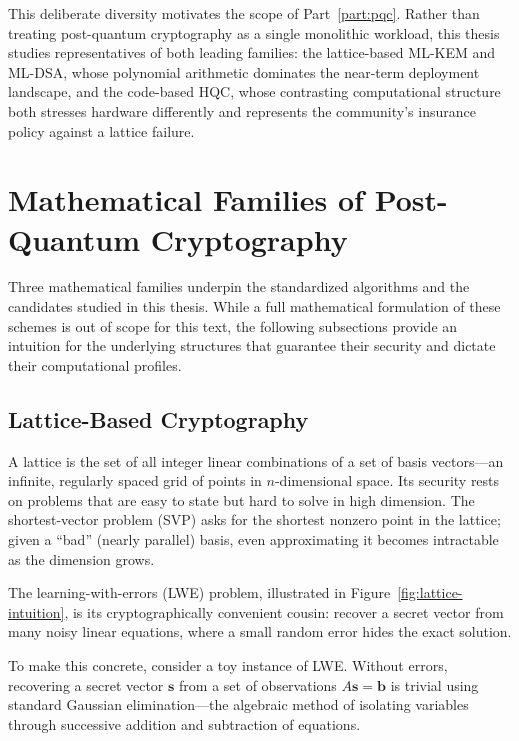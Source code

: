 This deliberate diversity motivates the scope of Part~\ref{part:pqc}. Rather than treating post-quantum cryptography as a single monolithic workload, this thesis studies representatives of both leading families: the lattice-based ML-KEM and ML-DSA, whose polynomial arithmetic dominates the near-term deployment landscape, and the code-based HQC, whose contrasting computational structure both stresses hardware differently and represents the community's insurance policy against a lattice failure.

\section{Mathematical Families of Post-Quantum Cryptography}
\label{sec:pqc-families}

Three mathematical families underpin the standardized algorithms and the candidates studied in this thesis. While a full mathematical formulation of these schemes is out of scope for this text, the following subsections provide an intuition for the underlying structures that guarantee their security and dictate their computational profiles.

\subsection{Lattice-Based Cryptography}
\label{subsec:lattice-crypto}

A lattice is the set of all integer linear combinations of a set of basis vectors---an infinite, regularly spaced grid of points in $n$-dimensional space. Its security rests on problems that are easy to state but hard to solve in high dimension. The shortest-vector problem (SVP) asks for the shortest nonzero point in the lattice; given a ``bad'' (nearly parallel) basis, even approximating it becomes intractable as the dimension grows. 

The learning-with-errors (LWE) problem, illustrated in Figure~\ref{fig:lattice-intuition}, is its cryptographically convenient cousin: recover a secret vector from many noisy linear equations, where a small random error hides the exact solution.

To make this concrete, consider a toy instance of LWE. Without errors, recovering a secret vector $\mathbf{s}$ from a set of observations $A\mathbf{s} = \mathbf{b}$ is trivial using standard Gaussian elimination---the algebraic method of isolating variables through successive addition and subtraction of equations. 

